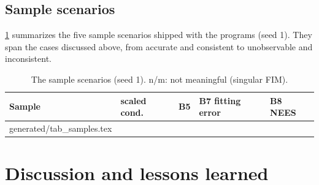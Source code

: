 \documentclass[11pt,a4paper]{article}
\makeatletter
\newcommand{\tablerows}[1]{\@@input generated/#1.tex }
\theoremstyle{plain}
\theoremstyle{remark}
\makeatother
\begin{document}
\subsection{Sample scenarios}

\cref{tab:samples} summarizes the five sample scenarios shipped with the
programs (seed 1). They span the cases discussed above, from accurate and
consistent to unobservable and inconsistent.

\begin{table}[htbp]
\centering\small
\caption{The sample scenarios (seed 1). n/m: not meaningful (singular FIM).}
\label{tab:samples}
\begin{tabular}{@{}lllll@{}}
\toprule
Sample & scaled cond. & B5 & B7 fitting error & B8 NEES\\
\midrule
\tablerows{tab_samples}
\bottomrule
\end{tabular}
\end{table}

\section{Discussion and lessons learned}
\label{sec:lessons}
\end{document}
